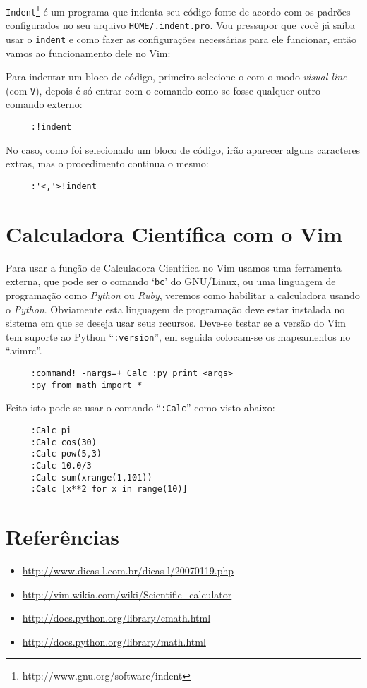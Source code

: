 {\tt Indent}\footnote{http://www.gnu.org/software/indent} 
é um programa que indenta seu código fonte de acordo com os padrões configurados
no seu arquivo {\tt HOME/.indent.pro}. Vou pressupor que você já saiba usar o {\tt indent}
e como fazer as configurações necessárias para ele funcionar, então vamos ao funcionamento 
dele no Vim:

Para indentar um bloco de código, primeiro selecione-o com o modo {\em visual line} (com {\tt V}), 
depois é só entrar com o comando como se fosse qualquer outro comando externo:
\begin{verbatim}
     :!indent
\end{verbatim}

No caso, como foi selecionado um bloco de código, irão aparecer alguns caracteres extras, 
mas o procedimento continua o mesmo:
\begin{verbatim}
     :'<,'>!indent
\end{verbatim}


\section{Calculadora Científica com o Vim}
\label{sec:Calculadora Científica com o Vim}

Para usar a função de Calculadora Científica no Vim usamos uma ferramenta
externa, que pode ser o comando `{\tt bc}' do GNU/Linux, ou uma linguagem de
programação como {\em Python} ou {\em Ruby}, veremos como habilitar a
calculadora usando o {\em Python}. Obviamente esta linguagem de programação
deve estar instalada no sistema em que se deseja usar seus recursos.  Deve-se
testar se a versão do Vim tem suporte ao Python ``\verb+:version+'', em seguida
colocam-se os mapeamentos no ``.vimrc''.

\begin{verbatim}
     :command! -nargs=+ Calc :py print <args>
     :py from math import *
\end{verbatim}

Feito isto pode-se usar o comando ``{\tt :Calc}'' como visto abaixo:

\begin{verbatim}
     :Calc pi
     :Calc cos(30)
     :Calc pow(5,3)
     :Calc 10.0/3
     :Calc sum(xrange(1,101))
     :Calc [x**2 for x in range(10)] 
\end{verbatim}


\section{Referências}

\begin{itemize}
 \item \url{http://www.dicas-l.com.br/dicas-l/20070119.php}
 \item \url{http://vim.wikia.com/wiki/Scientific_calculator}
 \item \url{http://docs.python.org/library/cmath.html}
 \item \url{http://docs.python.org/library/math.html}
\end{itemize}

